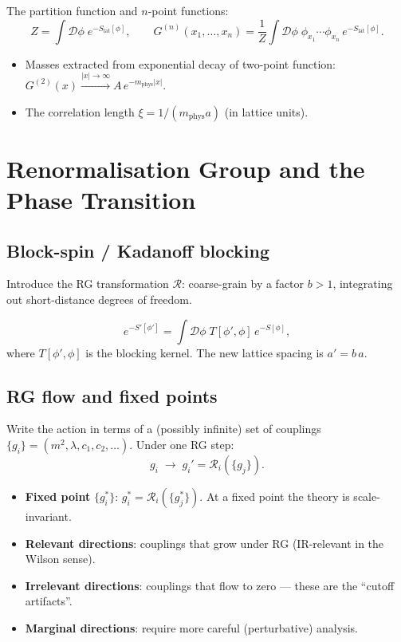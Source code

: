 \documentclass[11pt]{article}
\theoremstyle{definition}
\begin{document}
The partition function and $n$-point functions:
%
\begin{equation}
    Z = \int \mathcal{D}\phi\; e^{-S_{\text{lat}}[\phi]}, \qquad
    G^{(n)}(x_1,\ldots,x_n) = \frac{1}{Z}\int\mathcal{D}\phi\;\phi_{x_1}\cdots\phi_{x_n}\,e^{-S_{\text{lat}}[\phi]}.
\end{equation}
%
\begin{itemize}
    \item Masses extracted from exponential decay of two-point function:
          $G^{(2)}(x) \xrightarrow{|x|\to\infty} A\,e^{-m_{\text{phys}}|x|}$.
    \item The correlation length $\xi = 1/(m_{\text{phys}} a)$ (in lattice units).
\end{itemize}

\section{Renormalisation Group and the Phase Transition}

\subsection{Block-spin / Kadanoff blocking}

Introduce the RG transformation $\mathcal{R}$: coarse-grain by a factor $b>1$,
integrating out short-distance degrees of freedom.

\begin{equation}
    e^{-S'[\phi']} = \int \mathcal{D}\phi\; T[\phi',\phi]\,e^{-S[\phi]},
\end{equation}
%
where $T[\phi',\phi]$ is the blocking kernel.  The new lattice spacing is $a' = b\,a$.

\subsection{RG flow and fixed points}

Write the action in terms of a (possibly infinite) set of couplings
$\{g_i\} = (m^2, \lambda, c_1, c_2, \ldots)$.  Under one RG step:
%
\begin{equation}
    g_i \;\longrightarrow\; g_i' = \mathcal{R}_i(\{g_j\}).
\end{equation}

\begin{itemize}
    \item \textbf{Fixed point} $\{g_i^*\}$: $g_i^* = \mathcal{R}_i(\{g_j^*\})$.  At a fixed point the theory is scale-invariant.
    \item \textbf{Relevant directions}: couplings that grow under RG (IR-relevant in the Wilson sense).
    \item \textbf{Irrelevant directions}: couplings that flow to zero --- these are the ``cutoff artifacts''.
    \item \textbf{Marginal directions}: require more careful (perturbative) analysis.
\end{itemize}
\end{document}
